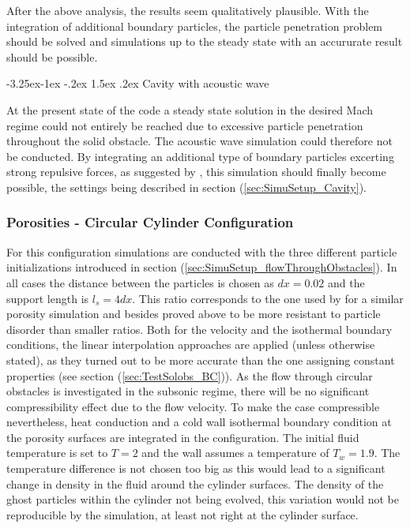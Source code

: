 \documentclass[11pt,a4paper,twoside]{report}
\makeatletter
\renewcommand\paragraph{\@startsection{paragraph}{4}{\z@}%
  {-3.25ex\@plus -1ex \@minus -.2ex}%
  {1.5ex \@plus .2ex}%
  {\normalfont\normalsize\bfseries}}
\makeatother
\begin{document}
After the above analysis, the results seem qualitatively plausible. With the integration of additional boundary particles, the particle penetration problem should be solved and simulations up to the steady state with an accururate result should be possible. 


\paragraph{Cavity with acoustic wave}

At the present state of the code a steady state solution in the desired Mach regime could not entirely be reached due to excessive particle penetration throughout the solid obstacle. The acoustic wave simulation could therefore not be conducted. By integrating an additional type of boundary particles excerting strong repulsive forces, as suggested by \cite{Liu2003}, this simulation should finally become possible, the settings being described in section (\ref{sec:SimuSetup_Cavity}). 





\subsubsection{Porosities - Circular Cylinder Configuration}
For this configuration simulations are conducted with the three different particle initializations introduced in section (\ref{sec:SimuSetup_flowThroughObstacles}). In all cases the distance between the particles is chosen as $dx=0.02$ and the support length is $l_s=4dx$. This ratio corresponds to the one used by \cite{Zhu1999} for a similar porosity simulation and besides proved above to be more resistant to particle disorder than smaller ratios. Both for the velocity and the isothermal boundary conditions, the linear interpolation approaches are applied (unless otherwise stated), as they turned out to be more accurate than the one assigning constant properties (see section (\ref{sec:TestSolobs_BC})). As the flow through circular obstacles is investigated in the subsonic regime, there will be no significant compressibility effect due to the flow velocity. To make the case compressible nevertheless, heat conduction and a cold wall isothermal boundary condition at the porosity surfaces are integrated in the configuration. The initial fluid temperature is set to $T=2$ and the wall assumes a temperature of $T_w=1.9$. The temperature difference is not chosen too big as this would lead to a significant change in density in the fluid around the cylinder surfaces. The density of the ghost particles within the cylinder not being evolved, this variation would not be reproducible by the simulation, at least not right at the cylinder surface.
\end{document}
